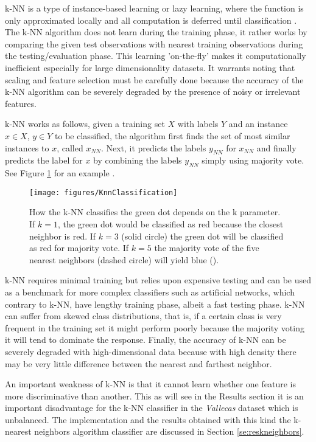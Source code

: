 \documentclass[11pt]{article}
\theoremstyle{definition}
\theoremstyle{remark}
\begin{document}
k-NN is a type of instance-based learning or lazy learning, where the function is only approximated locally and all computation is deferred until classification \cite{keller1985fuzzy}. The k-NN algorithm does not learn during the training phase, it rather works by comparing the given test observations with nearest training observations during the testing/evaluation phase. This learning 'on-the-fly' makes it computationally inefficient especially for large dimensionality datasets.
It warrants noting that scaling and feature selection must be carefully done because the accuracy of the k-NN algorithm can be severely degraded by the presence of noisy or irrelevant features. 

k-NN works as follows, given a training set $X$ with labels $Y$ and an instance $x \in X$, $y \in Y$ to be classified, the algorithm first finds the set of most similar instances to $x$, called $x_{NN}$. Next, it predicts the labels $y_{NN}$ for $x_{NN}$ and finally predicts the label for $x$ by combining the labels $y_{NN}$ simply using majority vote. See Figure \ref{fig:knnwiki} for an example . 

\begin{figure}[H]
        \centering
        \texttt{[image: figures/KnnClassification]}
        \caption{How the k-NN classifies the green dot depends on the k parameter. If $k=1$, the green dot would be classified as red because the closest neighbor is red. If $k=3$ (solid circle) the green dot will be classified as red for majority vote. If $k=5$ the majority vote of the five nearest neighbors (dashed circle) will yield blue (\cite{wiki:knn}).
        } \label{fig:knnwiki} 
\end{figure}


k-NN requires minimal training but relies upon expensive testing and can be used as a benchmark for more complex classifiers such as artificial networks, which contrary to k-NN, have lengthy training phase, albeit a fast testing phase. 
k-NN can suffer from skewed class distributions, that is, if a certain class is very frequent in the training set it might perform poorly because the majority voting it will tend to dominate the response. Finally, the accuracy of k-NN can be severely degraded with high-dimensional data because with high density there may be very little difference between the nearest and farthest neighbor.

An important weakness of k-NN is that it cannot learn whether one feature is more discriminative than another. This as will see in the Results section it is an important disadvantage for the k-NN classifier in the \emph{Vallecas} dataset which is unbalanced.
The implementation and the results obtained with this kind the k-nearest neighbors algorithm classifier are discussed in Section \ref{se:reskneighbors}.
\end{document}
